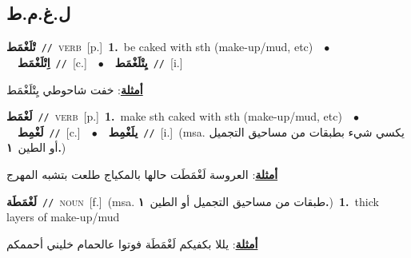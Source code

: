 \documentclass[10pt,a4paper,twoside]{article} %
\begin{document}
\begin{multicols}{2}
\vspace{-3mm}
\subsection*{\color{blue}\foreignlanguage{arabic}{ل.غ.م.ط}\color{blue}{}} 

{\setlength\topsep{0pt}\textbf{\foreignlanguage{arabic}{تْلَغْمَط}}\ {\color{gray}\texttt{//}\color{black}}\ \textsc{verb}\ [p.]\ \textbf{1.}~be caked with sth (make-up/mud, etc)\ \ $\bullet$\ \ \setlength\topsep{0pt}\textbf{\foreignlanguage{arabic}{اِتْلَغْمَط}}\ {\color{gray}\texttt{//}\color{black}}\ [c.]\ \ $\bullet$\ \ \setlength\topsep{0pt}\textbf{\foreignlanguage{arabic}{يِتْلَغْمَط}}\ {\color{gray}\texttt{//}\color{black}}\ [i.]\  \begin{flushright}\color{gray}\foreignlanguage{arabic}{\textbf{\underline{\foreignlanguage{arabic}{أمثلة}}}: خفت شاحوطي يِتْلَغْمَط}\end{flushright}\color{black}} \vspace{2mm}

{\setlength\topsep{0pt}\textbf{\foreignlanguage{arabic}{لَغْمَط}}\ {\color{gray}\texttt{//}\color{black}}\ \textsc{verb}\ [p.]\ \textbf{1.}~make sth caked with sth (make-up/mud, etc)\ \ $\bullet$\ \ \setlength\topsep{0pt}\textbf{\foreignlanguage{arabic}{لَغْمِط}}\ {\color{gray}\texttt{//}\color{black}}\ [c.]\ \ $\bullet$\ \ \setlength\topsep{0pt}\textbf{\foreignlanguage{arabic}{يلَغْمِط}}\ {\color{gray}\texttt{//}\color{black}}\ [i.]\ \color{gray}(msa. \foreignlanguage{arabic}{يكسي شيء بطبقات من مساحيق التجميل أو الطين}~\foreignlanguage{arabic}{\textbf{١.}})\color{black}\  \begin{flushright}\color{gray}\foreignlanguage{arabic}{\textbf{\underline{\foreignlanguage{arabic}{أمثلة}}}: العروسة لَغْمَطَت حالها بالمكياج طلعت بتشبه المهرج}\end{flushright}\color{black}} \vspace{2mm}

{\setlength\topsep{0pt}\textbf{\foreignlanguage{arabic}{لَغْمَطَة}}\ {\color{gray}\texttt{//}\color{black}}\ \textsc{noun}\ [f.]\ \color{gray}(msa. \foreignlanguage{arabic}{طبقات من مساحيق التجميل أو الطين}~\foreignlanguage{arabic}{\textbf{١.}})\color{black}\ \textbf{1.}~thick layers of make-up/mud\  \begin{flushright}\color{gray}\foreignlanguage{arabic}{\textbf{\underline{\foreignlanguage{arabic}{أمثلة}}}: يللا بكفيكم لَغْمَطَة فوتوا عالحمام خليني أحممكم}\end{flushright}\color{black}} \vspace{2mm}


\end{multicols}
\end{document}
